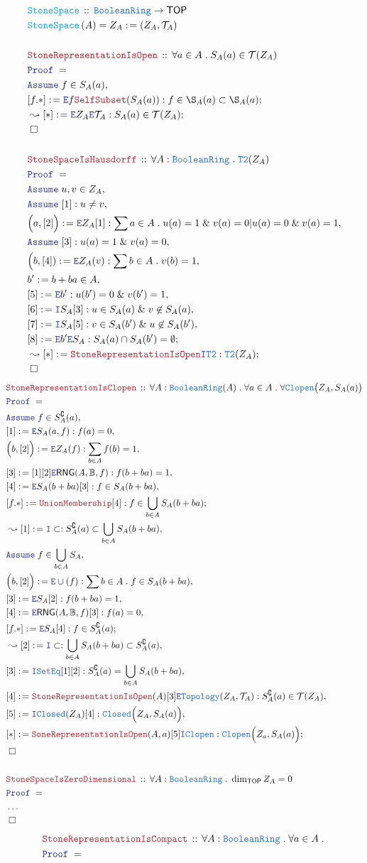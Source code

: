 \documentclass[12pt]{scrartcl}
\newcommand{\TYPE}[1]{\textcolor{NavyBlue}{\mathtt{#1}}}
\newcommand{\FUNC}[1]{\textcolor{Cerulean}{\mathtt{#1}}}
\newcommand{\LOGIC}[1]{\textcolor{Blue}{\mathtt{#1}}}
\newcommand{\THM}[1]{\textcolor{Maroon}{\mathtt{#1}}}
\renewcommand{\.}{\; . \;}
\newcommand{\de}{: \kern 0.1pc =}
\newcommand{\Act}[1]{\left( #1 \right)}
\newcommand{\Theorem}[2]{& \THM{#1} \, :: \, #2 \\ & \Proof = \\ }
\newcommand{\DeclareFunc}[2]{& \FUNC{#1} \, :: \, #2 \\}
\newcommand{\DefineNamedFunc}[4]{&  \FUNC{#1}\Act{#2} = #3 \de #4 \\}
\newcommand{\Page}[1]{ \begin{align*} #1 \end{align*}   }
\newcommand{\NoProof}{ & \ldots \\ \EndProof}
\renewcommand{\And}{\; \& \;}
\newcommand{\Intro}{\LOGIC{I}}
\newcommand{\Elim}{\LOGIC{E}}
\renewcommand{\c}{\complement}
\newcommand{\Say}[3]{& #1 \de #2 : #3, \\}
\newcommand{\SayIn}[3]{& #1 \de #2 \in #3, \\}
\newcommand{\Conclude}[3]{& #1 \de #2 : #3; \\}
\newcommand{\Derive}[3]{& \leadsto #1 \de #2 : #3, \\}
\newcommand{\DeriveConclude}[3]{& \leadsto #1 \de #2 : #3 ; \\}
\newcommand{\Assume}[2]{& \LOGIC{Assume} \; #1 : #2, \\}
\newcommand{\AssumeIn}[2]{& \LOGIC{Assume} \; #1 \in #2, \\}
\newcommand{\QED}{\; \square}
\newcommand{\EndProof}{& \QED \\}
\newcommand{\Proof}{\LOGIC{Proof} \; }
\newcommand{\RNG}{\mathsf{RNG}}
\newcommand{\Clopen}{\TYPE{Clopen}}
\newcommand{\Closed}{\TYPE{Closed}}
\newcommand{\TOP}{\mathsf{TOP}}
\newcommand{\T}{\mathcal{T}}
\newcommand{\Bool}{\mathbb{B}}
\newcommand{\BR}{\TYPE{BooleanRing}}
\begin{document}
\Page{
	\DeclareFunc{StoneSpace}{\BR \to \TOP}
	\DefineNamedFunc{StoneSpace}{A}{Z_A}{(Z_A,\T_A)}
	\\
	\Theorem{StoneRepresentationIsOpen}
	{
		\forall a \in A \. S_A(a) \in \T(Z_A)
	}
	\AssumeIn{f}{S_A(a)}
	\Conclude{[f.*]}{\Elim f \THM{SelfSubset}(S_A(a))}{ f \in \S_A(a) \subset \S_A(a)}
	\DeriveConclude{[*]}{\Elim Z_A \Elim \T_A}{S_A(a) \in \T(Z_A)}
	\EndProof
	\\
	\Theorem{StoneSpaceIsHausdorff}
	{
		\forall A : \BR \. \TYPE{T2}(Z_A)
	}
	\AssumeIn{u,v}{Z_A}
	\Assume{[1]}{u \neq v}
	\Say{\Big( a, [2] \Big)}{\Elim Z_A[1]}
	{
		\sum a \in A \. u(a) = 1 \And v(a) = 0 | u(a)=0 \And v(a) = 1
	}
	\Assume{[3]}{u(a) = 1 \And v(a) = 0}
	\Say{\Big(b,[4])}{\Elim Z_A(v)}{\sum b \in A \. v(b) = 1}
	\SayIn{b'}{ b + ba}{A}
	\Say{[5]}{\Elim b'}{u(b') = 0 \And v(b') = 1}
	\Say{[6]}{\Intro S_A [3]}{ u \in S_A(a) \And v \not \in S_A(a)}
	\Say{[7]}{\Intro S_A [5]}{v \in S_A(b') \And u \not \in S_A(b')}
	\Conclude{[8]}{\Elim b' \Elim S_A}{S_A(a) \cap S_A(b') = \emptyset}
	\DeriveConclude{[*]}{\THM{StoneRepresentationIsOpen} \Intro \TYPE{T2}}{\TYPE{T2}(Z_A)}
	\EndProof
}\Page{
	\Theorem{StoneRepresentationIsClopen}
	{
		\forall A : \BR(A) \.
		\forall a \in A \.
		\forall \Clopen\big( Z_A, S_A(a) \big)
	}
	\AssumeIn{f}{S_A^\c(a)}
	\Say{[1]}{\Elim S_A(a,f)}{f(a) = 0}
	\Say{\Big(b,[2]\Big)}{\Elim Z_A(f)}{\sum_{b \in A} f(b) = 1}
	\Say{[3]}{[1][2]\Elim \RNG(A,\Bool,f)}{f( b + ba )  = 1}
	\Say{[4]}{\Elim S_A(b + ba) [3]}{ f \in S_A(b + ba)}
	\Conclude{[f.*]}{\THM{UnionMembership}[4] }{f \in \bigcup_{b \in A} S_A(b + ba)}
	\Derive{[1]}{\Intro \subset}{S_A^\c(a) \subset \bigcup_{b \in A} S_A(b + ba)}
	\AssumeIn{f}{\bigcup_{b \in A} S_A}
	\Say{\Big(b,[2]\Big)}{\Elim \cup(f)}{\sum b \in A \. f \in S_A(b + ba)}
	\Say{[3]}{\Elim S_A [2]}{f(b + ba) = 1}
	\Say{[4]}{\Elim \RNG(A,\Bool,f)[3]}{f(a) = 0}
	\Conclude{[f.*]}{\Elim S_A [4]}{f \in S_A^\c(a)}
	\Derive{[2]}{\Intro \subset}{ \bigcup_{b \in A} S_A(b + ba) \subset S_A^\c(a)}
	\Say{[3]}{\Intro \TYPE{SetEq}[1][2]}{S_A^\c(a) = \bigcup_{b \in A} S_A(b + ba)}
	\Say{[4]}{\THM{StoneRepresentationIsOpen}(A)[3]\Elim \TYPE{Topology}(Z_A,\T_A)}
	{
		S_A^\c(a) \in \T(Z_A)
	}
	\Say{[5]}{\Intro \Closed(Z_A)[4]}{\Closed\Big(Z_A,S_A(a)\Big)}
	\Conclude{[*]}{\THM{SoneRepresentationIsOpen}(A,a)[5]\Intro \Clopen}{\Clopen\Big(Z_a,S_A(a)\Big)}
	\EndProof
	\\
	\Theorem{StoneSpaceIsZeroDimensional}
	{
		\forall A : \BR \. \dim_\TOP Z_A = 0
	}
	\NoProof
}\Page{
	\Theorem{StoneRepresentationIsCompact}
	{
		\forall A : \BR \.
		\forall a \in A \. 
}}
\end{document}
